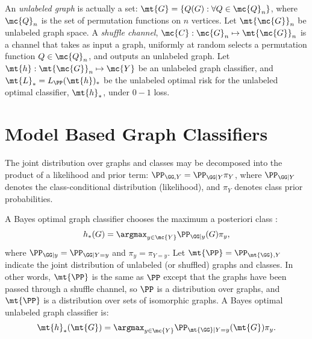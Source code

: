 \documentclass[10pt,journal,cspaper,compsoc]{IEEEtran}
\newcommand{\Qs}{Q}
\begin{document}
An \emph{unlabeled graph} is actually a set: $\mt{G}=\{\Qs(G): \forall \Qs \in \mc{Q}_n\}$, where $\mc{Q}_n$ is the set of permutation functions on $n$ vertices. Let $\mt{\mc{G}}_n$ be unlabeled graph space. A \emph{shuffle channel}, $\mc{C}: \mc{G}_n \mapsto \mt{\mc{G}}_n$ is a channel that takes as input a graph, uniformly at random selects a permutation function $\Qs \in \mc{Q}_n$, and outputs an unlabeled graph.  Let $\mt{h}: \mt{\mc{G}}_n \mapsto \mc{Y}$ be an unlabeled graph classifier, and $\mt{L}_*=L_{\PP}(\mt{h})_*$ be the unlabeled optimal risk for the unlabeled optimal classifier, $\mt{h}_*$, under $0-1$ loss. %

\section{Model Based Graph Classifiers} %
\label{sec:model_based_graph_classifiers}


The joint distribution over graphs and classes may be decomposed into the product of a likelihood and prior term: $\PP_{\GG,Y} = \PP_{\GG|Y}\pi_Y$, where $\PP_{\GG | Y }$ denotes the class-conditional distribution (likelihood), and 
 $\pi_Y$ denotes class prior probabilities.

A Bayes optimal graph classifier chooses the maximum a posteriori class \cite{DEV96}:
\begin{align} \label{eq:bayes}
	 h_*(G) = \argmax_{y \in \mc{Y}} \PP_{\GG | y}(G) \pi_{y},
\end{align}
where $\PP_{\GG|y}=\PP_{\GG|Y=y}$ and $\pi_y=\pi_{Y=y}$. Let $\mt{\PP}=\PP_{\mt{\GG},Y}$ indicate the joint distribution of unlabeled (or shuffled) graphs and classes.  In other words, $\mt{\PP}$ is the same as $\PP$ except that the graphs have been passed through a shuffle channel, so $\PP$ is a distribution over graphs, and $\mt{\PP}$ is a distribution over sets of isomorphic graphs.  A Bayes optimal unlabeled graph classifier is:
\begin{align} \label{eq:unbayes}
	 \mt{h}_*(\mt{G}) = \argmax_{y \in \mc{Y}} \PP_{\mt{\GG} | Y=y}(\mt{G}) \pi_{y}.
\end{align}
\end{document}

